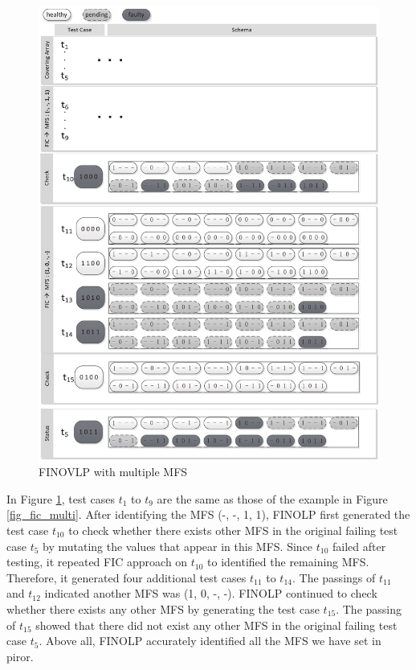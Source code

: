 \begin{figure}[!htb]
 \centering
 \includegraphics[width=5.3in]{finovlp.pdf}
 \caption{FINOVLP with multiple MFS}
 \label{fig_finovlp_multi}
\end{figure}

In Figure \ref{fig_finovlp_multi}, test cases $t_{1}$ to $t_{9}$ are the same as those of the example in Figure \ref{fig_fic_multi}.  After identifying the MFS (-, -, 1, 1), FINOLP first generated the test case $t_{10}$ to check whether there exists other MFS in the original failing test case $t_{5}$ by mutating the values that appear in this MFS. Since $t_{10}$ failed after testing, it repeated FIC approach on $t_{10}$ to identified the remaining MFS. Therefore, it generated four additional test cases $t_{11}$ to $t_{14}$. The passings of $t_{11}$ and $t_{12}$ indicated another MFS was (1, 0, -, -). FINOLP continued to check whether there exists any other MFS by generating the test case $t_{15}$. The passing of $t_{15}$ showed that there did not exist any other MFS in the original failing test case $t_{5}$. Above all, FINOLP accurately identified all the MFS we have set in piror.

